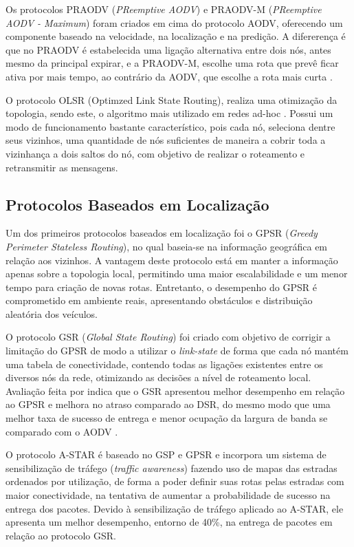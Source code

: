 \documentclass[
	12pt,				%
	oneside,			%
	a4paper,			%
	english,			%
	brazil				%
	]{abntex2ppgsi}
\begin{document}
Os protocolos PRAODV (\textit{PReemptive AODV}) e PRAODV-M (\textit{PReemptive AODV - Maximum}) foram criados em cima do protocolo AODV, oferecendo um componente baseado na velocidade, na localização  e na predição. A difererença é que no PRAODV é estabelecida uma ligação alternativa entre dois nós, antes mesmo da principal expirar, e a PRAODV-M, escolhe uma rota que prevê ficar ativa por mais tempo, ao contrário da AODV, que escolhe a rota mais curta \cite{luis2009melhoria}. 

O protocolo OLSR (Optimzed Link State Routing), realiza uma otimização da topologia, sendo este, o algoritmo mais utilizado em redes ad-hoc \cite{jacquet2001optimized}. Possui um modo de funcionamento bastante característico, pois cada nó, seleciona dentre seus vizinhos, uma quantidade de nós suficientes de maneira a cobrir toda a vizinhança a dois saltos do nó, com objetivo de realizar o roteamento e retransmitir as mensagens. 

\subsection{Protocolos Baseados em Localização}

Um dos primeiros protocolos baseados em localização foi o GPSR (\textit{Greedy Perimeter Stateless Routing}), no qual baseia-se na informação geográfica em relação aos vizinhos. A vantagem deste protocolo está em manter a informação apenas sobre a topologia local, permitindo uma maior escalabilidade e um menor tempo para criação de novas rotas. Entretanto, o desempenho do GPSR é comprometido em ambiente reais, apresentando obstáculos e distribuição aleatória dos veículos.

O protocolo GSR (\textit{Global State Routing}) foi criado com objetivo de corrigir a limitação do GPSR de modo a utilizar o \textit{link-state} de forma que cada nó mantém uma tabela de conectividade, contendo todas as ligações existentes entre os diversos nós da rede, otimizando as decisões a nível de roteamento local. Avaliação feita por   indica que o GSR apresentou melhor desempenho em relação ao GPSR e melhora no atraso comparado ao DSR, do mesmo modo que uma melhor taxa de sucesso de entrega e menor ocupação da largura de banda se comparado com o AODV \cite{li2007routing}.  

O protocolo A-STAR é baseado no GSP e GPSR e incorpora um sistema de sensibilização de tráfego (\textit{traffic awareness}) fazendo uso de mapas das estradas ordenados por utilização, de forma a poder definir suas rotas pelas estradas com maior conectividade, na tentativa de aumentar a probabilidade de sucesso na entrega dos pacotes. Devido à sensibilização de tráfego aplicado ao A-STAR, ele apresenta um melhor desempenho, entorno de 40\%, na entrega de pacotes em relação ao protocolo GSR.
\end{document}
